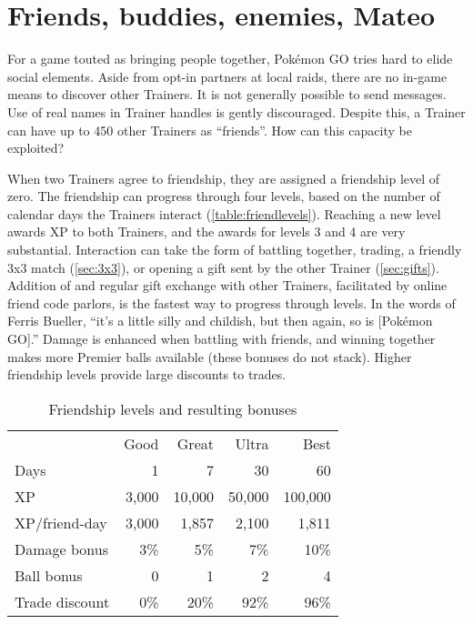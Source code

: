 \chapter{Friends, buddies, enemies, Mateo\label{chap:friends}}
For a game touted as bringing people together, Pokémon GO tries hard to elide social elements.
Aside from opt-in partners at local raids, there are no in-game means to discover other Trainers.
It is not generally possible to send messages.
Use of real names in Trainer handles is gently discouraged.
Despite this, a Trainer can have up to 450 other Trainers as ``friends''.
How can this capacity be exploited?

When two Trainers agree to friendship, they are assigned a friendship level of zero.
The friendship can progress through four levels, based on the number of calendar
  days the Trainers interact (\autoref{table:friendlevels}).
Reaching a new level awards XP to both Trainers, and the awards for levels 3 and 4 are very substantial.
Interaction can take the form of battling together, trading, a friendly 3x3 match (\autoref{sec:3x3}), or
  opening a gift sent by the other Trainer (\autoref{sec:gifts}).
Addition of and regular gift exchange with other Trainers, facilitated by online friend code parlors,
  is the fastest way to progress through levels.
In the words of Ferris Bueller, ``it's a little silly and childish, but then again, so is [Pokémon GO].''
Damage is enhanced when battling with friends, and winning together
  makes more Premier balls available (these bonuses do not stack).
Higher friendship levels provide large discounts to trades.
\begin{table}
\centering
\begin{tabular}{lrrrr}
 & Good & Great & Ultra & Best\\
\Midrule
Days & 1 & 7 & 30 & 60\\
XP  & 3,000 & 10,000 & 50,000 & 100,000\\
XP/friend-day & 3,000 & 1,857 & 2,100 & 1,811\\
Damage bonus & 3\% & 5\% & 7\% & 10\%\\
Ball bonus & 0 & 1 & 2 & 4\\
Trade discount & 0\% & 20\% & 92\% & 96\% \\
\end{tabular}
  \caption{Friendship levels and resulting bonuses\label{table:friendlevels}}
\end{table}

